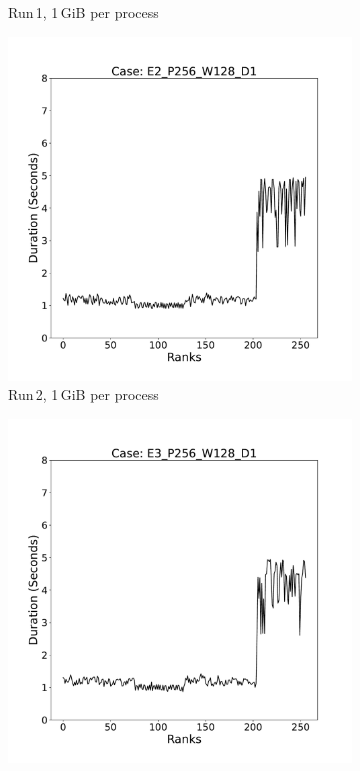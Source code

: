\begin{figure}[h!]
\begin{subfigure}[b]{0.3\textwidth}
         \caption{Run\,1, 1\,GiB per process}
         \label{fig:E1_1}
     \end{subfigure}
     \hfill
     \begin{subfigure}[b]{0.3\textwidth}
         \centering
         \includegraphics[width=\textwidth, height=\textwidth]{figures/E2_P256_W128_D1.pdf}
         \caption{Run\,2, 1\,GiB per process}
         \label{fig:E2_1}
     \end{subfigure}
      \hfill
     \begin{subfigure}[b]{0.3\textwidth}
         \centering
         \includegraphics[width=\textwidth, height=\textwidth]{figures/E3_P256_W128_D1.pdf}

\end{subfigure}
\end{figure}
